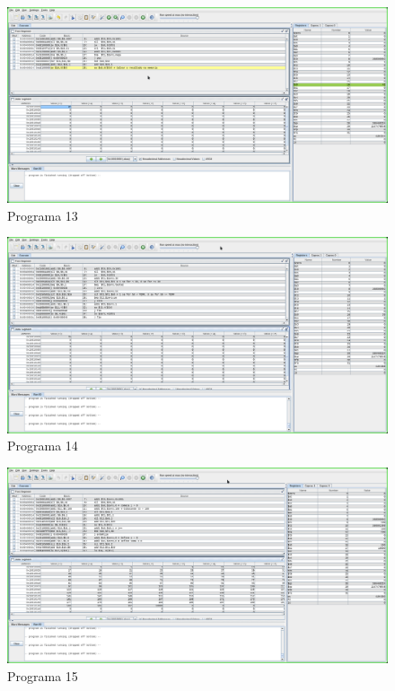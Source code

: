 \documentclass[a4paper,11pt,fleqn]{article}
\begin{document}
\newpage
{}

\begin{figure}[!ht]
    \caption{Programa 13}
    \centering
    \includegraphics[width=1\textwidth]{programa13}
\end{figure}

\begin{figure}[!ht]
    \caption{Programa 14}
    \centering
    \includegraphics[width=1\textwidth]{programa14}
\end{figure}

\begin{figure}[!ht]
    \caption{Programa 15}
    \centering
    \includegraphics[width=1\textwidth]{programa15}
\end{figure}
\end{document}
